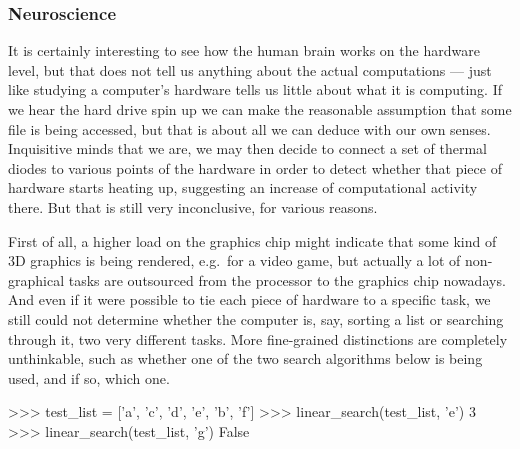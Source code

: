 \subsubsection{Neuroscience}

It is certainly interesting to see how the human brain works on the hardware level, but that does not tell us anything about the actual computations --- just like studying a computer's hardware tells us little about what it is computing.
If we hear the hard drive spin up we can make the reasonable assumption that some file is being accessed, but that is about all we can deduce with our own senses.
Inquisitive minds that we are, we may then decide to connect a set of thermal diodes to various points of the hardware in order to detect whether that piece of hardware starts heating up, suggesting an increase of computational activity there.
But that is still very inconclusive, for various reasons.

First of all, a higher load on the graphics chip might indicate that some kind of 3D graphics is being rendered, e.g.\ for a video game, but actually a lot of non-graphical tasks are outsourced from the processor to the graphics chip nowadays.
And even if it were possible to tie each piece of hardware to a specific task,
we still could not determine whether the computer is, say, sorting a list or searching through it, two very different tasks.
More fine-grained distinctions are completely unthinkable, such as whether one of the two search algorithms below is being used, and if so, which one.
%
\begin{center}
\end{center}
\begin{center}
    \begin{pythoncode}
        >>> test_list = ['a', 'c', 'd', 'e', 'b', 'f']
        >>> linear_search(test_list, 'e')
        3
        >>> linear_search(test_list, 'g')
        False
    \end{pythoncode}
\end{center}

